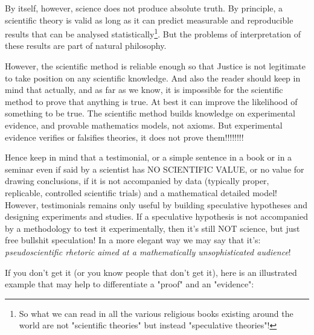 	By itself, however, science does not produce absolute truth. By principle, a scientific theory is valid as long as it can predict measurable and reproducible results that can be analysed statistically\footnote{So what we can read in all the various religious books existing around the world are not "scientific theories" but instead "speculative theories"!}. But the problems of interpretation of these results are part of natural philosophy.
	\begin{center}
	\end{center}
	However, the scientific method is reliable enough so that Justice is not legitimate to take position on any scientific knowledge. And also the reader should keep in mind that actually, and as far as we know, it is impossible for the scientific method to prove that anything is true. At best it can improve the likelihood of something to be true. The scientific method builds knowledge on experimental evidence, and provable mathematics models, not axioms. But experimental evidence verifies or falsifies theories, it does not prove them!!!!!!!!
	\begin{tcolorbox}[title=Remark,colframe=black,arc=10pt]
	Hence keep in mind that a testimonial, or a simple sentence in a book or in a seminar even if said by a scientist has NO SCIENTIFIC VALUE, or no value for drawing conclusions, if it is not accompanied by data (typically proper, replicable, controlled scientific trials) and a mathematical detailed model! However, testimonials remains only useful by building speculative hypotheses and designing experiments and studies. If a speculative hypothesis is not accompanied by a methodology to test it experimentally, then it's still NOT science, but just free bullshit speculation! In a more elegant way we may say that it's: \textit{pseudoscientific rhetoric aimed at a mathematically unsophisticated audience}!
	\end{tcolorbox}
	If you don't get it (or you know people that don't get it), here is an illustrated example that may help to differentiate a "proof" and an "evidence":
	
